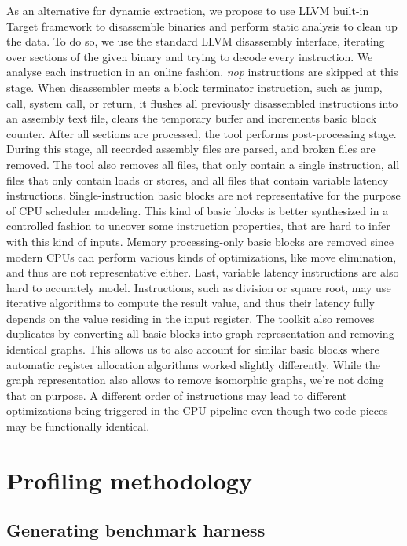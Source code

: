 As an alternative for dynamic extraction, we propose to use LLVM built-in Target framework to 
disassemble binaries and perform static analysis to clean up the data. To do so, we use the standard 
LLVM disassembly interface, iterating over sections of the given binary and trying to decode every 
instruction. We analyse each instruction in an online fashion. \textit{nop} instructions are skipped 
at this stage. When disassembler meets a block terminator instruction, such as jump, call, system 
call, or return, it flushes all previously disassembled instructions into an assembly text file, 
clears the temporary buffer and increments basic block counter. After all sections are processed, 
the tool performs post-processing stage. During this stage, all recorded assembly files are parsed, 
and broken files are removed. The tool also removes all files, that only contain a single instruction, 
all files that only contain loads or stores, and all files that contain variable latency instructions. 
Single-instruction basic blocks are not representative for the purpose of CPU scheduler modeling. 
This kind of basic blocks is better synthesized in a controlled fashion to uncover some instruction 
properties, that are hard to infer with this kind of inputs. Memory processing-only basic blocks are 
removed since modern CPUs can perform various kinds of optimizations, like move 
elimination\cite{Intel64IA322022}, and thus are not representative either. Last, variable latency 
instructions are also hard to accurately model. Instructions, such as division or square root, may 
use iterative algorithms to compute the result value, and thus their latency fully depends on the 
value residing in the input register. The toolkit also removes duplicates by converting all basic 
blocks into graph representation and removing identical graphs. This allows us to also account for 
similar basic blocks where automatic register allocation algorithms worked slightly differently. 
While the graph representation also allows to remove isomorphic graphs, we're not doing that on purpose. 
A different order of instructions may lead to different optimizations being triggered in the CPU pipeline 
even though two code pieces may be functionally identical.

\section{Profiling methodology}

\subsection{Generating benchmark harness}

